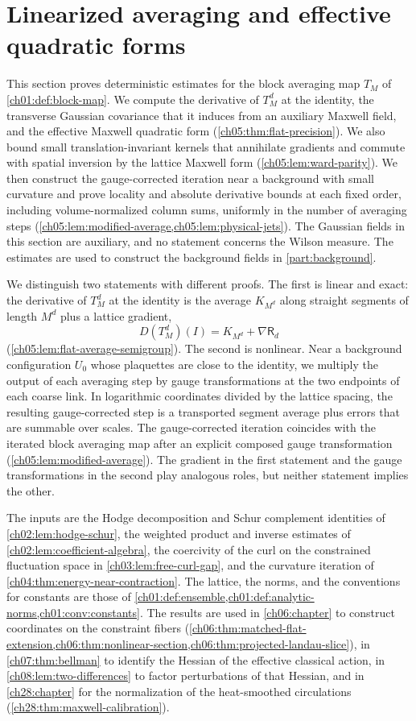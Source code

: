 \chapter{Linearized averaging and effective quadratic forms}\label{ch05:chapter}

This section proves deterministic estimates for the block averaging map $T_M$ of \cref{ch01:def:block-map}. We compute the derivative of $T_M^d$ at the identity, the transverse Gaussian covariance that it induces from an auxiliary Maxwell field, and the effective Maxwell quadratic form (\cref{ch05:thm:flat-precision}). We also bound small translation-invariant kernels that annihilate gradients and commute with spatial inversion by the lattice Maxwell form (\cref{ch05:lem:ward-parity}). We then construct the gauge-corrected iteration near a background with small curvature and prove locality and absolute derivative bounds at each fixed order, including volume-normalized column sums, uniformly in the number of averaging steps (\cref{ch05:lem:modified-average,ch05:lem:physical-jets}). The Gaussian fields in this section are auxiliary, and no statement concerns the Wilson measure. The estimates are used to construct the background fields in \cref{part:background}.

We distinguish two statements with different proofs. The first is linear and exact: the derivative of $T_M^d$ at the identity is the average $K_{M^d}$ along straight segments of length $M^d$ plus a lattice gradient,
\[
 D(T_M^d)(I)=K_{M^d}+\nabla\mathsf R_d
\]
(\cref{ch05:lem:flat-average-semigroup}). The second is nonlinear. Near a background configuration $U_0$ whose plaquettes are close to the identity, we multiply the output of each averaging step by gauge transformations at the two endpoints of each coarse link. In logarithmic coordinates divided by the lattice spacing, the resulting gauge-corrected step is a transported segment average plus errors that are summable over scales. The gauge-corrected iteration coincides with the iterated block averaging map after an explicit composed gauge transformation (\cref{ch05:lem:modified-average}). The gradient in the first statement and the gauge transformations in the second play analogous roles, but neither statement implies the other.

The inputs are the Hodge decomposition and Schur complement identities of \cref{ch02:lem:hodge-schur}, the weighted product and inverse estimates of \cref{ch02:lem:coefficient-algebra}, the coercivity of the curl on the constrained fluctuation space in \cref{ch03:lem:free-curl-gap}, and the curvature iteration of \cref{ch04:thm:energy-near-contraction}. The lattice, the norms, and the conventions for constants are those of \cref{ch01:def:ensemble,ch01:def:analytic-norms,ch01:conv:constants}. The results are used in \cref{ch06:chapter} to construct coordinates on the constraint fibers (\cref{ch06:thm:matched-flat-extension,ch06:thm:nonlinear-section,ch06:thm:projected-landau-slice}), in \cref{ch07:thm:bellman} to identify the Hessian of the effective classical action, in \cref{ch08:lem:two-differences} to factor perturbations of that Hessian, and in \cref{ch28:chapter} for the normalization of the heat-smoothed circulations (\cref{ch28:thm:maxwell-calibration}).

